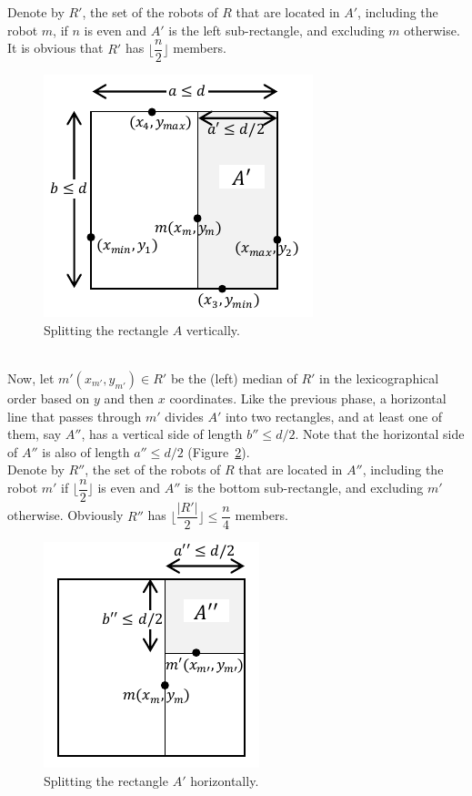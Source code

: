 \documentclass[review]{elsarticle}
\begin{document}
Denote by $R'$, the set of the robots of $R$ that are located in $A'$, including the robot $m$, if $n$ is even and $A'$ is the left sub-rectangle, and excluding $m$ otherwise. It is obvious that $R'$ has $\lfloor\dfrac{n}{2}\rfloor$ members.
\begin{figure} [h]
  \centering
  \includegraphics[scale=1]{Figs/fig4.pdf}
  \vspace{-15pt}
  \caption{Splitting the rectangle $A$ vertically.}
  \label{fig:split A}
\end{figure}\\
Now, let $m'(x_{m'},y_{m'})\in R'$ be the (left) median of $R'$ in the lexicographical order based on $y$ and then $x$ coordinates. Like the previous phase, a horizontal line that passes through $m'$ divides $A'$ into two rectangles, and at least one of them, say $A''$, has a vertical side of length $b''\leq d/2$. Note that the horizontal side of $A''$ is also of length $a''\leq d/2$ (Figure~\ref{fig:split A'}).\\
Denote by $R''$, the set of the robots of $R$ that are located in $A''$, including the robot $m'$ if $\lfloor\dfrac{n}{2}\rfloor$ is even and $A''$ is the bottom sub-rectangle, and excluding $m'$ otherwise. Obviously $R''$ has $\big\lfloor\dfrac{|R'|}{2}\big\rfloor \le \dfrac{n}{4}$ members.
\begin{figure} [h]
  \centering
  \includegraphics[scale=1]{Figs/fig5.pdf}
  \vspace{-15pt}
  \caption{Splitting the rectangle $A'$ horizontally.}
  \label{fig:split A'}
\end{figure}\\
\end{document}
